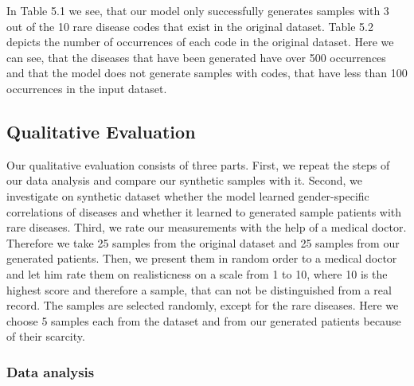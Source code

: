 \documentclass[11pt, a4paper]{book}
\begin{document}
In Table 5.1 we see, that our model only successfully generates samples with 3 out of the 10 rare disease codes that exist in the original dataset.
Table 5.2 depicts the number of occurrences of each code in the original dataset. Here we can see, that the diseases that have been generated have over 500 occurrences and that the model  does not generate samples with codes, that have less than 100 occurrences in the input dataset.

\subsection{Qualitative Evaluation}
Our qualitative evaluation consists of three parts. First, we repeat the steps of our data analysis and compare our synthetic samples with it. Second, we investigate on synthetic dataset whether the model learned gender-specific correlations of diseases and whether it learned to generated sample patients with rare diseases. Third, we rate our measurements with the help of a medical doctor. Therefore we take 25 samples from the original dataset and 25 samples from our generated patients. Then, we present them in random order to a medical doctor and let him rate them on realisticness on a scale from 1 to 10, where 10 is the highest score and therefore a sample, that can not be distinguished from a real record.
The samples are selected randomly, except for the rare diseases. Here we choose 5 samples each from the dataset and from our generated patients because of their scarcity.

\subsubsection{Data analysis}
\end{document}
